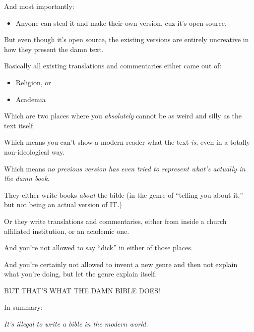{ \hX{} }
{ \eX{} }
{
    And most importantly:

    \begin{itemize}

    \item Anyone can steal it and make their own version, cuz it's open source.

    \end{itemize}
}

{ \hX{} }
{ \eX{} }
{
    But even though it's open source, the existing versions are entirely uncreative in how they present the damn text.

    Basically all existing translations and commentaries either came out of:

    \begin{itemize}

    \item Religion, or

    \item Academia

    \end{itemize}
}

{ \hX{} }
{ \eX{} }
{
    Which are two places where you \emph{absolutely} cannot be as weird and silly as the text itself.

    Which means you can't show a modern reader what the text \emph{is,} even in a totally non-ideological way.

    Which means \emph{no previous version has even tried to represent what's actually in the damn book.}
}

{ \hX{} }
{ \eX{} }
{
    They either write books \emph{about} the bible (in the genre of ``telling you about it,'' but not being an actual version of IT.)

    Or they write translations and commentaries, either from inside a church affiliated institution, or an academic one.
}

{ \hX{} }
{ \eX{} }
{
    And you're not allowed to say ``dick'' in either of those places.

    And you're certainly not allowed to invent a new genre and then not explain what you're doing, but let the genre explain itself.

    BUT THAT'S WHAT THE DAMN BIBLE DOES!
}

{ \hX{} }
{ \eX{} }
{
    In summary:

    \emph{It's illegal to write a bible in the modern world.}
}


